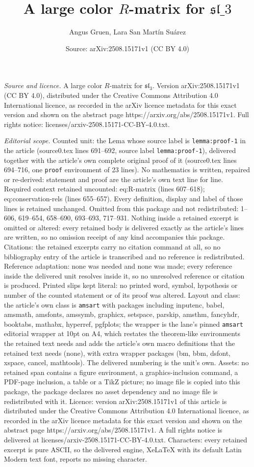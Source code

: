 \documentclass[10pt,a4paper]{amsart}
\title[A large color $R$-matrix for $\mathfrak{sl}\_3$]{A large color $R$-matrix for $\mathfrak{sl}\_3$}
\author{Angus Gruen, Lara San Mart\'in Su\'arez}
\date{Source: arXiv:2508.15171v1 (CC BY 4.0)}
\begin{document}
\maketitle

\noindent\emph{Source and licence.} A large color $R$-matrix for $\mathfrak{sl}_3$. Version arXiv:2508.15171v1 (CC BY 4.0), distributed under the Creative Commons Attribution 4.0 International licence, as recorded in the arXiv licence metadata for this exact version and shown on the abstract page https://arxiv.org/abs/2508.15171v1. Full rights notice: licenses/arxiv-2508.15171-CC-BY-4.0.txt.\par\smallskip

\noindent\textit{Editorial scope.} Counted unit: the Lema whose source label is \texttt{lemma:proof-1} in the article (source0.tex lines 691--692, source label \texttt{lemma:proof-1}), delivered together with the article's own complete original proof of it (source0.tex lines 694--716, one \texttt{proof} environment of 23 lines). No mathematics is written, repaired or re-derived: statement and proof are the article's own text line for line. Required context retained uncounted: eq:R-matrix (lines 607--618); eq:conservation-rels (lines 655--657). Every definition, display and label of those lines is retained unchanged. Omitted from this package and not redistributed: 1--606, 619--654, 658--690, 693--693, 717--931. Nothing inside a retained excerpt is omitted or altered: every retained body is delivered exactly as the article's lines are written, so no omission receipt of any kind accompanies this package. Citations: the retained excerpts carry no citation command at all, so no bibliography entry of the article is transcribed and no reference is redistributed. Reference adaptation: none was needed and none was made; every reference inside the delivered unit resolves inside it, so no unresolved reference or citation is produced. Printed slips kept literal: no printed word, symbol, hypothesis or number of the counted statement or of its proof was altered. Layout and class: the article's own class is \texttt{amsart} with packages including inputenc, babel, amsmath, amsfonts, amssymb, graphicx, setspace, parskip, amsthm, fancyhdr, booktabs, mathabx, hyperref, pgfplots; the wrapper is the lane's pinned \texttt{amsart} editorial wrapper at 10pt on A4, which restates the theorem-like environments the retained text needs and adds the article's own macro definitions that the retained text needs (none), with extra wrapper packages (bm, bbm, dsfont, xspace, cancel, mathtools). The delivered numbering is the unit's own. Assets: no retained span contains a figure environment, a graphics-inclusion command, a PDF-page inclusion, a table or a TikZ picture; no image file is copied into this package, the package declares no asset dependency and no image file is redistributed with it. Licence: version arXiv:2508.15171v1 of this article is distributed under the Creative Commons Attribution 4.0 International licence, as recorded in the arXiv licence metadata for this exact version and shown on the abstract page https://arxiv.org/abs/2508.15171v1. A full rights notice is delivered at licenses/arxiv-2508.15171-CC-BY-4.0.txt. Characters: every retained excerpt is pure ASCII, so the delivered engine, XeLaTeX with its default Latin Modern text font, reports no missing character.
\end{document}
